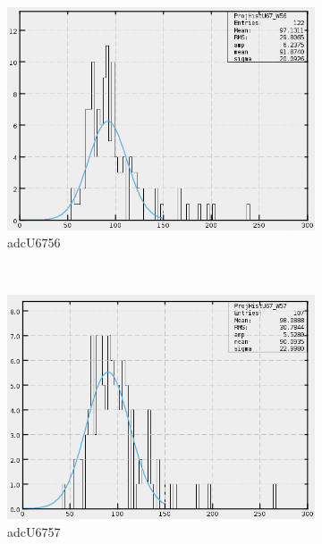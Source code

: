 \begin{figure}[h]
    \centering
    \begin{subfigure}[h]{0.3\textwidth}
        \centering
        \includegraphics[width=\textwidth, keepaspectratio = true]{adcU67_56}
        \caption{adcU6756}
        \label{fig:adcU67_56}
    \end{subfigure}
    ~
    \begin{subfigure}[h]{0.3\textwidth}
        \centering
        \includegraphics[width=\textwidth, keepaspectratio = true]{adcU67_57}
        \caption{adcU6757}
        \label{fig:adcU67_57}
    \end{subfigure}
    ~
    \begin{subfigure}[h]{0.3\textwidth}
        \centering

\end{subfigure}
\end{figure}

